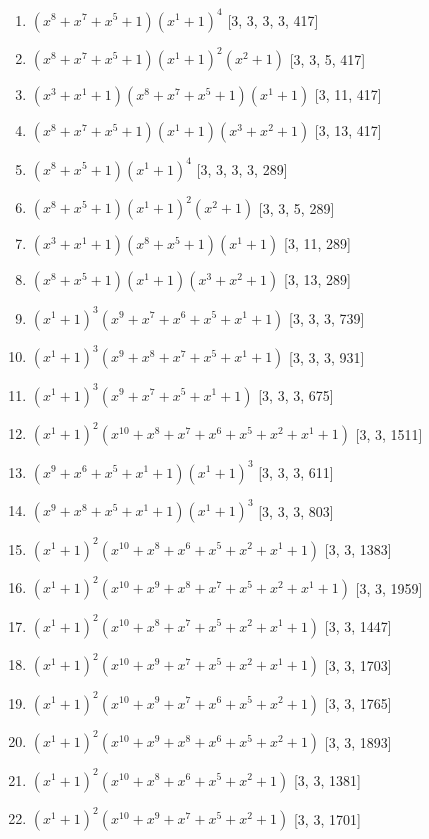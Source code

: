 \documentclass[10pt,twocolumn]{article}
\begin{document}
\begin{enumerate}
\item $(x^{8} + x^{7} + x^{5} + 1)(x^{1} + 1)^{4}$  [3, 3, 3, 3, 417]
\item $(x^{8} + x^{7} + x^{5} + 1)(x^{1} + 1)^{2}(x^{2} + 1)$  [3, 3, 5, 417]
\item $(x^{3} + x^{1} + 1)(x^{8} + x^{7} + x^{5} + 1)(x^{1} + 1)$  [3, 11, 417]
\item $(x^{8} + x^{7} + x^{5} + 1)(x^{1} + 1)(x^{3} + x^{2} + 1)$  [3, 13, 417]
\item $(x^{8} + x^{5} + 1)(x^{1} + 1)^{4}$  [3, 3, 3, 3, 289]
\item $(x^{8} + x^{5} + 1)(x^{1} + 1)^{2}(x^{2} + 1)$  [3, 3, 5, 289]
\item $(x^{3} + x^{1} + 1)(x^{8} + x^{5} + 1)(x^{1} + 1)$  [3, 11, 289]
\item $(x^{8} + x^{5} + 1)(x^{1} + 1)(x^{3} + x^{2} + 1)$  [3, 13, 289]
\item $(x^{1} + 1)^{3}(x^{9} + x^{7} + x^{6} + x^{5} + x^{1} + 1)$  [3, 3, 3, 739]
\item $(x^{1} + 1)^{3}(x^{9} + x^{8} + x^{7} + x^{5} + x^{1} + 1)$  [3, 3, 3, 931]
\item $(x^{1} + 1)^{3}(x^{9} + x^{7} + x^{5} + x^{1} + 1)$  [3, 3, 3, 675]
\item $(x^{1} + 1)^{2}(x^{10} + x^{8} + x^{7} + x^{6} + x^{5} + x^{2} + x^{1} + 1)$  [3, 3, 1511]
\item $(x^{9} + x^{6} + x^{5} + x^{1} + 1)(x^{1} + 1)^{3}$  [3, 3, 3, 611]
\item $(x^{9} + x^{8} + x^{5} + x^{1} + 1)(x^{1} + 1)^{3}$  [3, 3, 3, 803]
\item $(x^{1} + 1)^{2}(x^{10} + x^{8} + x^{6} + x^{5} + x^{2} + x^{1} + 1)$  [3, 3, 1383]
\item $(x^{1} + 1)^{2}(x^{10} + x^{9} + x^{8} + x^{7} + x^{5} + x^{2} + x^{1} + 1)$  [3, 3, 1959]
\item $(x^{1} + 1)^{2}(x^{10} + x^{8} + x^{7} + x^{5} + x^{2} + x^{1} + 1)$  [3, 3, 1447]
\item $(x^{1} + 1)^{2}(x^{10} + x^{9} + x^{7} + x^{5} + x^{2} + x^{1} + 1)$  [3, 3, 1703]
\item $(x^{1} + 1)^{2}(x^{10} + x^{9} + x^{7} + x^{6} + x^{5} + x^{2} + 1)$  [3, 3, 1765]
\item $(x^{1} + 1)^{2}(x^{10} + x^{9} + x^{8} + x^{6} + x^{5} + x^{2} + 1)$  [3, 3, 1893]
\item $(x^{1} + 1)^{2}(x^{10} + x^{8} + x^{6} + x^{5} + x^{2} + 1)$  [3, 3, 1381]
\item $(x^{1} + 1)^{2}(x^{10} + x^{9} + x^{7} + x^{5} + x^{2} + 1)$  [3, 3, 1701]

\end{enumerate}
\end{document}
